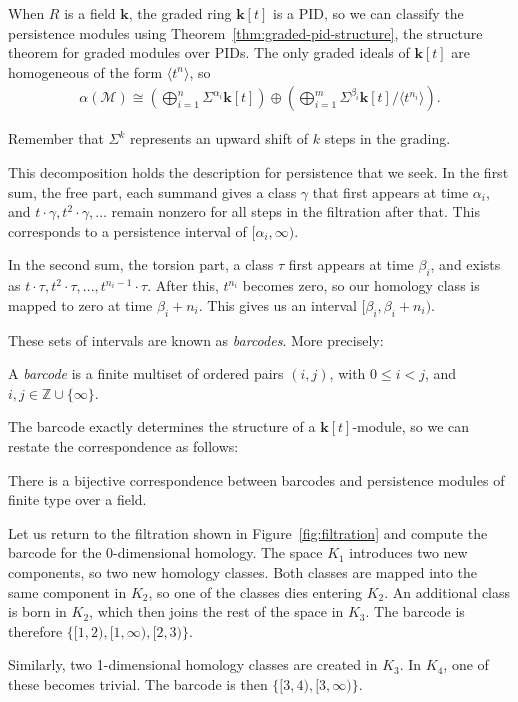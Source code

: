 When $R$ is a field $\mathbf{k}$, the graded ring $\mathbf{k}[t]$ is a PID, so we can classify the persistence modules using Theorem~\ref{thm:graded-pid-structure}, the structure theorem for graded modules over PIDs. The only graded ideals of $\mathbf{k}[t]$ are homogeneous of the form $\langle t^n \rangle$, so
\begin{align*}
\alpha(\mathcal{M}) \cong \left( \bigoplus_{i=1}^n \Sigma^{\alpha_i} \mathbf{k}[t] \right) \oplus \left( \bigoplus_{i=1}^m \Sigma^{\beta_i} \mathbf{k}[t] / \langle t^{n_i} \rangle \right).
\end{align*}

Remember that $\Sigma^k$ represents an upward shift of $k$ steps in the grading.

This decomposition holds the description for persistence that we seek. In the first sum, the free part, each summand gives a class $\gamma$ that first appears at time $\alpha_i$, and $t \cdot \gamma, t^2 \cdot \gamma, \dots$ remain nonzero for all steps in the filtration after that. This corresponds to a persistence interval of $[\alpha_i, \infty)$.

In the second sum, the torsion part, a class $\tau$ first appears at time $\beta_i$, and exists as $t \cdot \tau, t^2 \cdot \tau, ..., t^{n_i-1} \cdot \tau$. After this, $t^{n_i}$ becomes zero, so our homology class is mapped to zero at time $\beta_i + n_i$. This gives us an interval $[\beta_i, \beta_i + n_i)$.

These sets of intervals are known as \emph{barcodes}. More precisely:

\begin{definition}
A \emph{barcode} is a finite multiset of ordered pairs $(i, j)$, with $0 \leq i < j$, and $i, j \in \mathbb{Z} \cup \{\infty\}$.
\end{definition}

The barcode exactly determines the structure of a $\mathbf{k}[t]$-module, so we can restate the correspondence as follows:

\begin{corollary}
There is a bijective correspondence between barcodes and persistence modules of finite type over a field.
\end{corollary}

\begin{example}
Let us return to the filtration shown in Figure~\ref{fig:filtration} and compute the barcode for the 0-dimensional homology. The space $K_1$ introduces two new components, so two new homology classes. Both classes are mapped into the same component in $K_2$, so one of the classes dies entering $K_2$. An additional class is born in $K_2$, which then joins the rest of the  space in $K_3$. The barcode is therefore $\{[1,2), [1, \infty), [2, 3)\}$.

Similarly, two 1-dimensional homology classes are created in $K_3$. In $K_4$, one of these becomes trivial. The barcode is then $\{[3, 4), [3, \infty) \}$.
\end{example}

